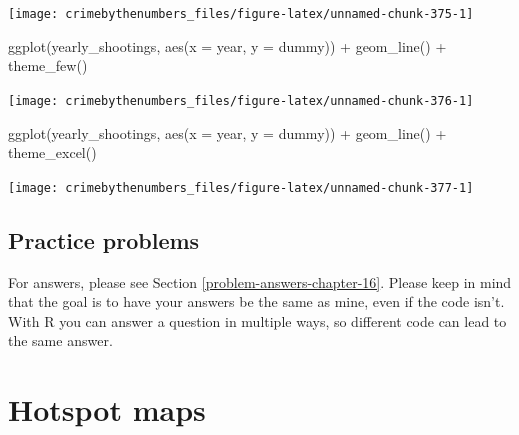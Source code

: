 \documentclass[
]{krantz}
\makeatletter
\newenvironment{Shaded}{\begin{snugshade}}{\end{snugshade}}
\newcommand{\AttributeTok}[1]{\textcolor[rgb]{0.61,0.61,0.61}{#1}}
\newcommand{\FunctionTok}[1]{\textcolor[rgb]{0,0,0}{#1}}
\newcommand{\NormalTok}[1]{#1}
\newcommand{\SpecialCharTok}[1]{\textcolor[rgb]{0,0,0}{#1}}
\newenvironment{kframe}{%
\medskip{}
\setlength{\fboxsep}{.8em}
 \def\at@end@of@kframe{}%
 \ifinner\ifhmode%
  \def\at@end@of@kframe{\end{minipage}}%
  \begin{minipage}{\columnwidth}%
 \fi\fi%
 \def\FrameCommand##1{\hskip\@totalleftmargin \hskip-\fboxsep
 \colorbox{shadecolor}{##1}\hskip-\fboxsep
     \hskip-\linewidth \hskip-\@totalleftmargin \hskip\columnwidth}%
 \MakeFramed {\advance\hsize-\width
   \@totalleftmargin\z@ \linewidth\hsize
   \@setminipage}}%
 {\par\unskip\endMakeFramed%
 \at@end@of@kframe}
\renewenvironment{Shaded}{\begin{kframe}}{\end{kframe}}
\makeatother
\begin{document}
\begin{center}\texttt{[image: crimebythenumbers\_files/figure-latex/unnamed-chunk-375-1]} \end{center}

\begin{Shaded}
\begin{Highlighting}[]
\FunctionTok{ggplot}\NormalTok{(yearly\_shootings, }\FunctionTok{aes}\NormalTok{(}\AttributeTok{x =}\NormalTok{ year, }\AttributeTok{y =}\NormalTok{ dummy)) }\SpecialCharTok{+}
  \FunctionTok{geom\_line}\NormalTok{() }\SpecialCharTok{+}
  \FunctionTok{theme\_few}\NormalTok{()}
\end{Highlighting}
\end{Shaded}

\begin{center}\texttt{[image: crimebythenumbers\_files/figure-latex/unnamed-chunk-376-1]} \end{center}

\begin{Shaded}
\begin{Highlighting}[]
\FunctionTok{ggplot}\NormalTok{(yearly\_shootings, }\FunctionTok{aes}\NormalTok{(}\AttributeTok{x =}\NormalTok{ year, }\AttributeTok{y =}\NormalTok{ dummy)) }\SpecialCharTok{+}
  \FunctionTok{geom\_line}\NormalTok{() }\SpecialCharTok{+}
  \FunctionTok{theme\_excel}\NormalTok{()}
\end{Highlighting}
\end{Shaded}

\begin{center}\texttt{[image: crimebythenumbers\_files/figure-latex/unnamed-chunk-377-1]} \end{center}

\hypertarget{practice-problems-9}{%
\section{Practice problems}\label{practice-problems-9}}

For answers, please see Section \ref{problem-answers-chapter-16}. Please keep in mind that the goal is to have your answers be the same as mine, even if the code isn't. With R you can answer a question in multiple ways, so different code can lead to the same answer.

\hypertarget{hotspot-maps}{%
\chapter{Hotspot maps}\label{hotspot-maps}}
\end{document}
